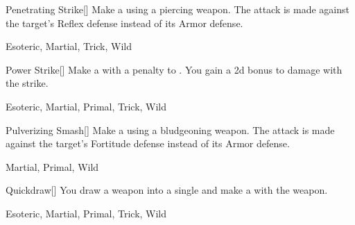 \lowercase{\hypertarget{maneuver:Penetrating Strike}{}}\label{maneuver:Penetrating Strike}
\hypertarget{maneuver:Penetrating Strike}{}
\begin{freeability}[Rank 1]{Penetrating Strike}[]
Make a  using a piercing weapon.
The attack is made against the target's Reflex defense instead of its Armor defense.


 Esoteric, Martial, Trick, Wild
\end{freeability}
\vspace{0.25em}



\lowercase{\hypertarget{maneuver:Power Strike}{}}\label{maneuver:Power Strike}
\hypertarget{maneuver:Power Strike}{}
\begin{freeability}[Rank 1]{Power Strike}[]
Make a  with a  penalty to .
You gain a \plus2d bonus to damage with the strike.


 Esoteric, Martial, Primal, Trick, Wild
\end{freeability}
\vspace{0.25em}



\lowercase{\hypertarget{maneuver:Pulverizing Smash}{}}\label{maneuver:Pulverizing Smash}
\hypertarget{maneuver:Pulverizing Smash}{}
\begin{freeability}[Rank 1]{Pulverizing Smash}[]
Make a  using a bludgeoning weapon.
The attack is made against the target's Fortitude defense instead of its Armor defense.


 Martial, Primal, Wild
\end{freeability}
\vspace{0.25em}



\lowercase{\hypertarget{maneuver:Quickdraw}{}}\label{maneuver:Quickdraw}
\hypertarget{maneuver:Quickdraw}{}
\begin{freeability}[Rank 1]{Quickdraw}[]
You draw a weapon into a single  and make a  with the weapon.


 Esoteric, Martial, Primal, Trick, Wild
\end{freeability}
\vspace{0.25em}



